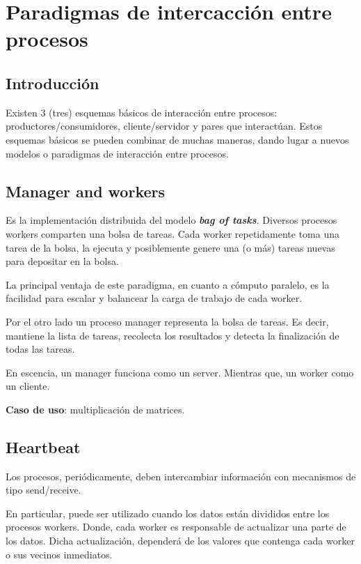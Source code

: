 \documentclass[a4paper, 10pt]{report}
\begin{document}
\chapter{Paradigmas de intercacción entre procesos}

\section{Introducción}

Existen 3 (tres) esquemas básicos de interacción entre procesos: productores/consumidores, cliente/servidor y pares que interactúan. Estos esquemas básicos se pueden combinar de muchas maneras, dando lugar a nuevos modelos o paradigmas de interacción entre procesos.

\section{Manager and workers}

Es la implementación distribuida del modelo \textbf{\emph{bag of tasks}}. Diversos procesos workers comparten una bolsa de tareas. Cada worker repetidamente toma una tarea de la bolsa, la ejecuta y posiblemente genere una (o más) tareas nuevas para depositar en la bolsa.

La principal ventaja de este paradigma, en cuanto a cómputo paralelo, es la facilidad para escalar y balancear la carga de trabajo de cada worker.

Por el otro lado un proceso manager representa la bolsa de tareas. Es decir, mantiene la lista de tareas, recolecta los resultados y detecta la finalización de todas las tareas.

En escencia, un manager funciona como un server. Mientras que, un worker como un cliente.

\textbf{Caso de uso}: multiplicación de matrices.

\section{Heartbeat}

Los procesos, periódicamente, deben intercambiar información con mecanismos de tipo send/receive.

En particular, puede ser utilizado cuando los datos están divididos entre los procesos workers. Donde, cada worker es responsable de actualizar una parte de los datos. Dicha actualización, dependerá de los valores que contenga cada worker o sus vecinos inmediatos.
\end{document}
